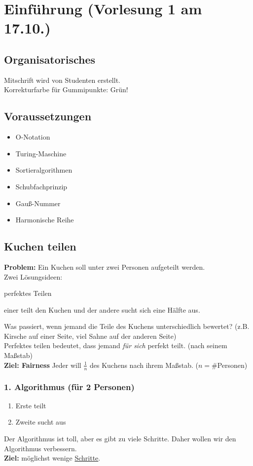 \section{Einführung \tiny (Vorlesung 1 am 17.10.)}
\subsection{Organisatorisches}
Mitschrift wird von Studenten erstellt.\\

Korrekturfarbe für Gummipunkte: Grün!\\

\subsection*{Voraussetzungen}
\begin{itemize}
\item O-Notation
\item Turing-Maschine
\item Sortieralgorithmen
\item Schubfachprinzip
\item Gauß-Nummer
\item Harmonische Reihe
\end{itemize}
\subsection{Kuchen teilen}

\textbf{Problem:} Ein Kuchen soll unter zwei Personen aufgeteilt werden.\\
Zwei Lösungsideen: 
\begin{compactitem}
\item perfektes Teilen
\item einer teilt den Kuchen und der andere sucht sich eine Hälfte aus.
\end{compactitem}
Was passiert, wenn jemand die Teile des Kuchens unterschiedlich bewertet? (z.B. Kirsche auf einer Seite, viel Sahne auf der anderen Seite)\\
Perfektes teilen bedeutet, dass jemand \emph{für sich} perfekt teilt. (nach seinem Maßstab)\\
\textbf{Ziel: Fairness} Jeder will $\frac{1}{n}$ des Kuchens nach ihrem Maßstab. ($n=\#$Personen)
\subsubsection{1. Algorithmus (für 2 Personen)}
\begin{enumerate}
\item Erste teilt
\item Zweite sucht aus
\end{enumerate}
Der Algorithmus ist toll, aber es gibt zu viele Schritte. Daher wollen wir den Algorithmus verbessern.\\
\textbf{Ziel:} möglichst wenige \underline{Schritte}.
